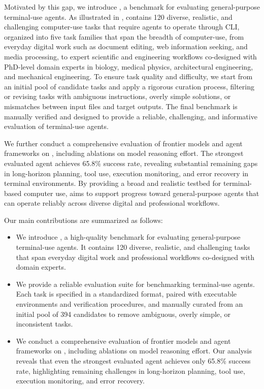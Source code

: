 Motivated by this gap, we introduce \benchname, a benchmark for evaluating general-purpose terminal-use agents. As illustrated in , \benchname contains 120 diverse, realistic, and challenging computer-use tasks that require agents to operate through CLI, organized into five task families that span the breadth of computer-use, from everyday digital work such as document editing, web information seeking, and media processing, to expert scientific and engineering workflows co-designed with PhD-level domain experts in biology, medical physics, architectural engineering, and mechanical engineering. To ensure task quality and difficulty, we start from an initial pool of candidate tasks and apply a rigorous curation process, filtering or revising tasks with ambiguous instructions, overly simple solutions, or mismatches between input files and target outputs. The final benchmark is manually verified and designed to provide a reliable, challenging, and informative evaluation of terminal-use agents.

We further conduct a comprehensive evaluation of frontier models and agent frameworks on \benchname, including ablations on model reasoning effort. The strongest evaluated agent achieves 65.8\% success rate, revealing substantial remaining gaps in long-horizon planning, tool use, execution monitoring, and error recovery in terminal environments. By providing a broad and realistic testbed for terminal-based computer use, \benchname aims to support progress toward general-purpose agents that can operate reliably across diverse digital and professional workflows.

Our main contributions are summarized as follows:

\begin{itemize}
    \item We introduce \benchname, a high-quality benchmark for evaluating general-purpose terminal-use agents. It contains 120 diverse, realistic, and challenging tasks that span everyday digital work and professional workflows co-designed with domain experts.

    \item We provide a reliable evaluation suite for benchmarking terminal-use agents. Each task is specified in a standardized format, paired with executable environments and verification procedures, and manually curated from an initial pool of 394 candidates to remove ambiguous, overly simple, or inconsistent tasks.

    \item We conduct a comprehensive evaluation of frontier models and agent frameworks on \benchname, including ablations on model reasoning effort. Our analysis reveals that even the strongest evaluated agent achieves only 65.8\% success rate, highlighting remaining challenges in long-horizon planning, tool use, execution monitoring, and error recovery.
\end{itemize}

